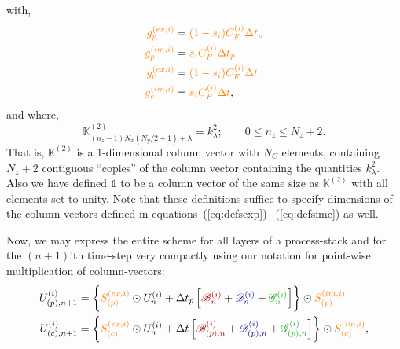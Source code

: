 \documentclass[12pt, letterpaper, oneside, leqno, openright]{memoir}
\newcommand{\bfield}{\mathscr{B}}
\newcommand{\dfield}{\mathscr{D}}
\newcommand{\gfield}{\mathscr{G}}
\newcommand{\kcolvec}{\mathbb{K}^{(2)}}
\begin{document}
%
with,
%
\begin{subequations}
\begin{align}
  {\color{orange}g^{(ex,i)}_{p}} &= {\color{orange}(1-s_i)C^{(i)}_F \Delta t_p} \label{eq:defgexp} \\
  {\color{orange}g^{(im,i)}_{p}} &= {\color{orange}   s_i C^{(i)}_F \Delta t_p} \label{eq:defgimp} \\
  {\color{orange}g^{(ex,i)}_{c}} &= {\color{orange}(1-s_i)C^{(i)}_F \Delta t  } \label{eq:defexc}  \\
  {\color{orange}g^{(im,i)}_{c}} &= {\color{orange}   s_i C^{(i)}_F \Delta t  },\label{eq:defimc}
\end{align}
\end{subequations}
%
and where,
%
\begin{equation}
  \kcolvec_{(n_z - 1)N_x(N_y/2+1) + \lambda} = k^2_\lambda;\qquad 0\le n_z \le N_z+2.
  \label{eq:defkcol}
\end{equation}
%
That is, $\kcolvec$ is a 1-dimensional column vector with $N_C$
elements, containing $N_z+2$ contiguous ``copies'' of the column
vector containing the quantities $k^2_\lambda$. Also we have defined
$\mathbb{1}$ to be a column vector of the same size as $\kcolvec$
with all elements set to unity. Note that these definitions suffice 
to specify dimensions of the column vectors defined in
equations~(\ref{eq:defsexp})$-$(\ref{eq:defsimc}) as well.
%
\par
%
Now, we may express the entire scheme for all layers of a 
process-stack and for the $(n+1)$'th time-step very compactly
using our notation for point-wise multiplication of column-vectors:
%
\begin{subequations}
\begin{align}
  U^{(i)}_{(p),n+1} &= 
  \biggl\{ 
%
            {\color{orange}S^{(ex,i)}_{(p)} } 
            \odot 
            U^{(i)}_n
%
  + \Delta t_p
    \left[
              { \color{red!65!black}   \bfield^{(i)}_n}
            + { \color{blue!65!black}  \dfield^{(i)}_n}
            + { \color{green!65!black} \gfield^{(i)}_n}
    \right]
 \biggr\} \odot 
%
{\color{orange} S^{(im,i)}_{(p)} }
%
 \label{eq:cipred}  \\
%
  U^{(i)}_{(c),n+1} &= 
   \biggl\{ 
%
 {\color{orange}S^{(ex,i)}_{(c)} }
             \odot 
             U^{(i)}_n
%
  + \Delta t 
    \left[
              {\color{red!65!black}  \bfield^{(i)}_{(p),n} }
            + {\color{blue!65!black} \dfield^{(i)}_{(p),n} }
            + {\color{green!65!black}\gfield^{(i)}_{(p),n} }
    \right]
  \biggr\} \odot 
  {\color{orange}S^{(im,i)}_{(c)} }
  \label{eq:cicorr},
\end{align}
\end{subequations}
\end{document}
